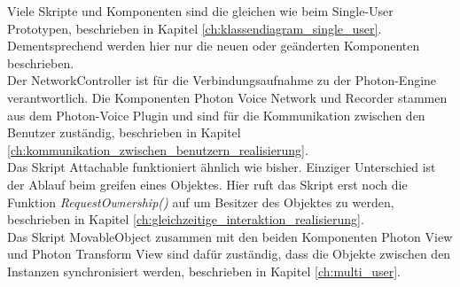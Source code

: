 Viele Skripte und Komponenten sind die gleichen wie beim Single-User Prototypen, beschrieben in Kapitel \ref{ch:klassendiagram_single_user}. Dementsprechend werden hier nur die neuen oder geänderten Komponenten beschrieben. \\
Der \grqq NetworkController\grqq{} ist für die Verbindungsaufnahme zu der Photon-Engine verantwortlich. Die Komponenten \grqq Photon Voice Network\grqq{} und \grqq Recorder\grqq{} stammen aus dem Photon-Voice Plugin und sind für die Kommunikation zwischen den Benutzer zuständig, beschrieben in Kapitel \ref{ch:kommunikation_zwischen_benutzern_realisierung}. \\
Das Skript \grqq Attachable\grqq{} funktioniert ähnlich wie bisher. Einziger Unterschied ist der Ablauf beim greifen eines Objektes. Hier ruft das Skript erst noch die Funktion \textit{RequestOwnership()} auf um Besitzer des Objektes zu werden, beschrieben in Kapitel \ref{ch:gleichzeitige_interaktion_realisierung}. \\
Das Skript \grqq MovableObject\grqq{} zusammen mit den beiden Komponenten \grqq Photon View\grqq{} und \grqq Photon Transform View\grqq{} sind dafür zuständig, dass die Objekte zwischen den Instanzen synchronisiert werden, beschrieben in Kapitel \ref{ch:multi_user}.